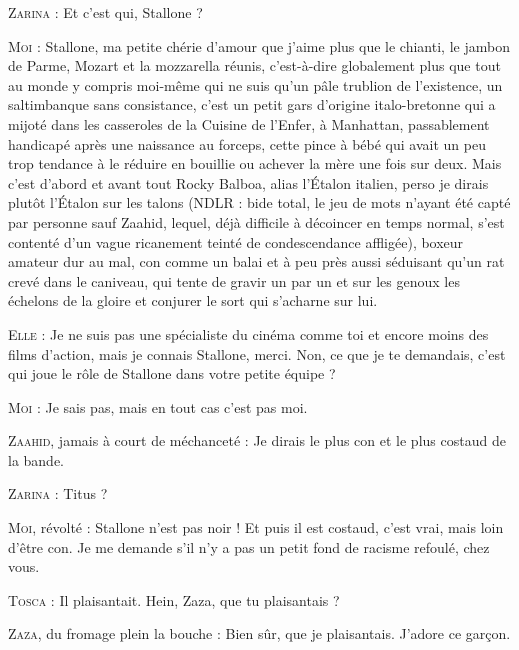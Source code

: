 \begin{dialogue}
\textsc{Zarina} : Et c’est qui, Stallone ?

\textsc{Moi} : Stallone, ma petite chérie d’amour que j’aime plus que le chianti, le jambon de Parme, Mozart et la mozzarella réunis, c’est-à-dire globalement plus que tout au monde y compris moi-même qui ne suis qu’un pâle trublion de l’existence, un saltimbanque sans consistance, c’est un petit gars d’origine italo-bretonne qui a mijoté dans les casseroles de la Cuisine de l’Enfer, à Manhattan, passablement handicapé après une naissance au forceps, cette pince à bébé qui avait un peu trop tendance à le réduire en bouillie ou achever la mère une fois sur deux. Mais c’est d’abord et avant tout Rocky Balboa, alias l’Étalon italien, perso je dirais plutôt l’Étalon sur les talons (NDLR : bide total, le jeu de mots n’ayant été capté par personne sauf Zaahid, lequel, déjà difficile à décoincer en temps normal, s’est contenté d’un vague ricanement teinté de condescendance affligée), boxeur amateur dur au mal, con comme un balai et à peu près aussi séduisant qu’un rat crevé dans le caniveau, qui tente de gravir un par un et sur les genoux les échelons de la gloire et conjurer le sort qui s’acharne sur lui.

\textsc{Elle} : Je ne suis pas une spécialiste du cinéma comme toi et encore moins des films d’action, mais je connais Stallone, merci. Non, ce que je te demandais, c’est qui joue le rôle de Stallone dans votre petite équipe ?

\textsc{Moi} : Je sais pas, mais en tout cas c’est pas moi.

\textsc{Zaahid}, jamais à court de méchanceté : Je dirais le plus con et le plus costaud de la bande.

\textsc{Zarina} : Titus ?

\textsc{Moi}, révolté : Stallone n’est pas noir ! Et puis il est costaud, c’est vrai, mais loin d’être con. Je me demande s’il n’y a pas un petit fond de racisme refoulé, chez vous.

\textsc{Tosca} : Il plaisantait. Hein, Zaza, que tu plaisantais ?

\textsc{Zaza}, du fromage plein la bouche : Bien sûr, que je plaisantais. J’adore ce garçon.


\end{dialogue}
